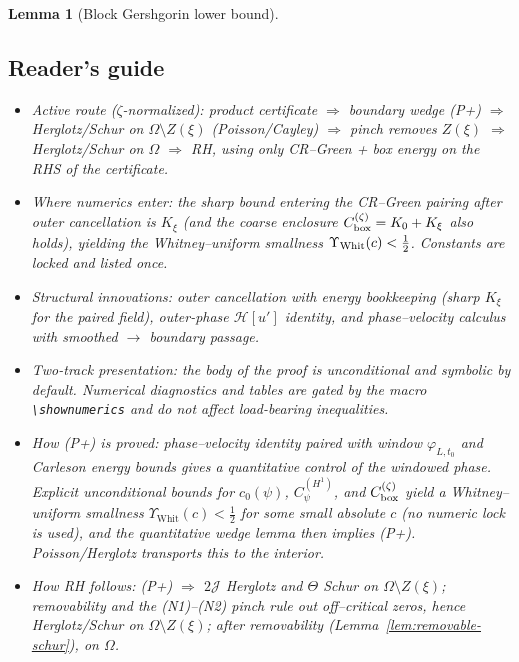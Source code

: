 \documentclass[11pt]{article}
\newcommand{\Hilb}{\mathcal H}
\newtheorem{lemma}{Lemma}[section]
\theoremstyle{definition}
\theoremstyle{remark}
\begin{document}
\begin{lemma}[Block Gershgorin lower bound]
\vspace{1.0cm}
\subsection*{Reader's guide}

\begin{itemize}
\item Active route ($\zeta$-normalized): product certificate $\Rightarrow$ boundary wedge (P+) $\Rightarrow$ Herglotz/Schur on $\Omega\setminus Z(\xi)$ (Poisson/Cayley) $\Rightarrow$ pinch removes $Z(\xi)$ $\Rightarrow$ Herglotz/Schur on $\Omega$ $\Rightarrow$ RH, using only CR–Green + box energy on the RHS of the certificate.
\item Where numerics enter: the sharp bound entering the CR–Green pairing after outer cancellation is $K_\xi$ (and the coarse enclosure $C_{\rm box}^{(\zeta)}=K_0+K_\xi$ also holds), yielding the Whitney–uniform smallness $\Upsilon_{\rm Whit}(c)<\tfrac12$. Constants are locked and listed once.
\item Structural innovations: outer cancellation with energy bookkeeping (sharp $K_\xi$ for the paired field), outer-phase $\Hilb[u']$ identity, and phase–velocity calculus with smoothed $\to$ boundary passage.
\item Two-track presentation: the body of the proof is unconditional and symbolic by default. Numerical diagnostics and tables are gated by the macro \verb+\shownumerics+ and do not affect load-bearing inequalities.
\item How (P+) is proved: phase–velocity identity paired with window $\varphi_{L,t_0}$ and Carleson energy bounds gives a quantitative control of the windowed phase. Explicit unconditional bounds for $c_0(\psi)$, $C_\psi^{(H^1)}$, and $C_{\rm box}^{(\zeta)}$ yield a Whitney–uniform smallness $\Upsilon_{\mathrm{Whit}}(c)<\tfrac12$ for some small absolute $c$ (no numeric lock is used), and the quantitative wedge lemma then implies (P+). Poisson/Herglotz transports this to the interior.
\item How RH follows: (P+) $\Rightarrow$ $2\mathcal J$ Herglotz and $\Theta$ Schur on $\Omega\setminus Z(\xi)$; removability and the (N1)–(N2) pinch rule out off–critical zeros, hence Herglotz/Schur on $\Omega\setminus Z(\xi)$; after removability (Lemma~\ref{lem:removable-schur}), on $\Omega$.
\end{itemize}








\end{lemma}
\end{document}
